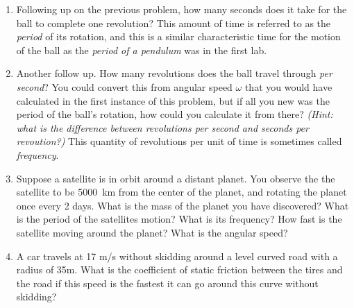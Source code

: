 \begin{enumerate}
\item
Following up on the previous problem, how many seconds does it take for the ball to complete one revolution? This amount of time is referred to as the \emph{period} of its rotation, and this is a similar characteristic time for the motion of the ball as the \emph{period of a pendulum} was in the first lab.\hugeskip

\item 
Another follow up. How many revolutions does the ball travel through \emph{per second}? You could convert this from angular speed $\omega$ that you would have calculated in the first instance of this problem, but if all you new was the period of the ball's rotation, how could you calculate it from there? \emph{(Hint: what is the difference between revolutions per second and seconds per revoution?)} This quantity of revolutions per unit of time is sometimes called \emph{frequency}.\hugeskip

\item 
Suppose a satellite is in orbit around a distant planet. You observe the the satellite to be \SI{5000}{\kilo\meter} from the center of the planet, and rotating the planet once every 2 days. What is the mass of the planet you have discovered? What is the period of the satellites motion? What is its frequency? How fast is the satellite moving around the planet? What is the angular speed?
\bigskip

\item
A car travels at 17 m/s without skidding around a level curved road with a radius of 35m. What is the coefficient of static friction between the tires and the road if this speed is the fastest it can go around this curve without skidding?


\end{enumerate}
